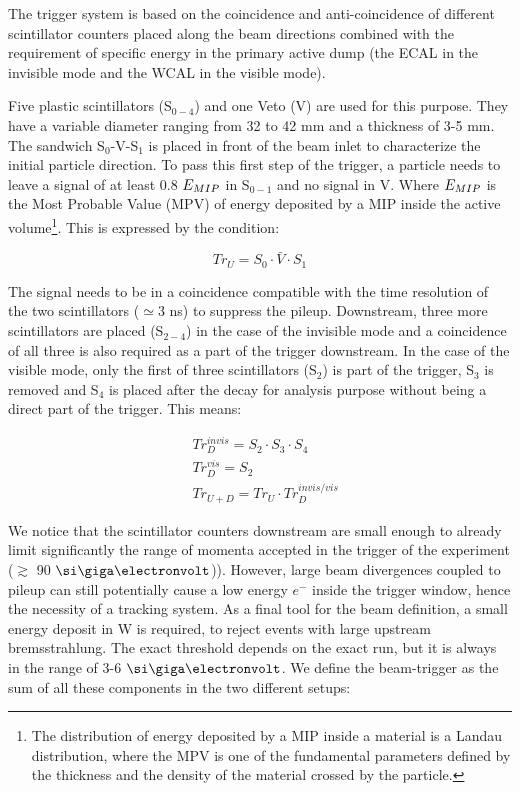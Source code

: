 The trigger system is based on the coincidence and anti-coincidence of different scintillator counters placed along the beam directions combined with the requirement of specific energy in the primary active dump (the ECAL in the invisible mode and the WCAL in the visible mode).

Five plastic scintillators (S$_{0-4}$) and one Veto (V) are used for this purpose. They have a variable diameter ranging from 32 to 42 \si{mm} and a thickness of 3-5 \si{mm}. The sandwich S$_0$-V-S$_1$ is placed in front of the beam inlet to characterize the initial particle direction. To pass this first step of the trigger, a particle needs to leave a signal of at least 0.8 $E_{MIP}$ in S$_{0-1}$ and no signal in V. Where $E_{MIP}$ is the Most Probable Value (MPV) of energy deposited by a MIP inside the active volume\footnote{The distribution of energy deposited by a MIP inside a material is a Landau distribution, where the MPV is one of the fundamental parameters defined by the thickness and the density of the material crossed by the particle.}. This is expressed by the condition:

\begin{equation}
\label{eq:trigger-upstream}
Tr_U = S_0 \cdot \bar{V} \cdot S_1
\end{equation}

The signal needs to be in a coincidence compatible with the time resolution of the two scintillators ($\simeq$3 \si{ns}) to suppress the pileup. Downstream, three more scintillators are placed (S$_{2-4}$) in the case of the invisible mode and a coincidence of all three is also required as a part of the trigger downstream. In the case of the visible mode, only the first of three scintillators (S$_2$) is part of the trigger, S$_3$ is removed and S$_4$ is placed after the decay for analysis purpose without being a direct part of the trigger. This means:

\begin{equation}
\label{eq:trigger-downstream}
\begin{split}      
& Tr^{invis}_D = S_2 \cdot S_3 \cdot S_4 \\
& Tr^{vis}_D = S_2 \\
& Tr_{U+D} = Tr_U \cdot Tr^{invis/vis}_D
\end{split}
\end{equation}

We notice that the scintillator counters downstream are small enough to already limit significantly the range of momenta accepted in the trigger of the experiment ($\gtrsim$ 90 $\gev$)). However, large beam divergences coupled to pileup can still potentially cause a low energy $e^-$ inside the trigger window, hence the
necessity of a tracking system. As a final tool for the beam definition, a small energy deposit in W is required, to reject events with large upstream bremsstrahlung. The exact threshold depends on the exact run, but it is always in the range of 3-6 $\gev$. We define the beam-trigger as the sum of all these components in the two different setups:

